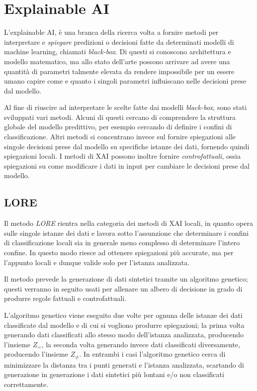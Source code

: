 \section{Explainable AI}\label{sec: bg_xai}

L'explainable AI, è una branca della ricerca volta a fornire metodi per
interpretare e \textit{spiegare} predizioni o decisioni fatte da determinati
modelli di machine learning, chiamati \textit{black-box}. Di questi si
conoscono architettura e modello matematico, ma allo stato dell'arte possono
arrivare ad avere una quantità di parametri talmente elevata da rendere
impossibile per un essere umano capire come e quanto i singoli parametri
influiscano nelle decisioni prese dal modello.

Al fine di riuscire ad interpretare le scelte fatte dai modelli
\textit{black-box}, sono stati sviluppati vari metodi. Alcuni di questi cercano
di comprendere la struttura globale del modello predittivo, per esempio cercando
di definire i confini di classificazione. Altri metodi si concentrano invece
sul fornire spiegazioni alle singole decisioni prese dal modello su specifiche
istanze dei dati, fornendo quindi spiegazioni locali. I metodi di XAI possono
inoltre fornire \textit{controfattuali}, ossia spiegazioni su come modificare i
dati in input per cambiare le decisioni prese dal modello.

\subsection*{LORE}

Il metodo \textit{LORE} rientra nella categoria dei metodi di XAI locali, in
quanto opera sulle singole istanze dei dati e lavora sotto l'assunzione che
determinare i confini di classificazione locali sia in generale meno complesso
di determinare l'intero confine. In questo modo riesce ad ottenere spiegazioni
più accurate, ma per l'appunto locali e dunque valide solo per l'istanza
analizzata.

Il metodo prevede la generazione di dati sintetici tramite un algoritmo
genetico; questi verranno in seguito usati per allenare un albero di decisione
in grado di produrre regole fattuali e controfattuali.

L'algoritmo genetico viene eseguito due volte per ognuna delle istanze dei dati
classificate dal modello e di cui si vogliono produrre spiegazioni; la prima
volta generando dati classificati allo stesso modo dell'istanza analizzata,
producendo l'insieme $Z_=$, la seconda volta generando invece dati classificati
diversamente, producendo l'insieme $Z_{\neq}$. In entrambi i casi l'algoritmo
genetico cerca di minimizzare la distanza tra i punti generati e l'istanza
analizzata, scartando di generazione in generazione i dati sintetici più lontani
e/o non classificati correttamente.

